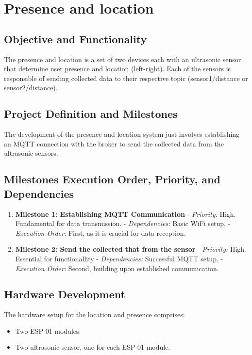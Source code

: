 \documentclass{article}
\begin{document}
\section{Presence and location}

\subsection{Objective and Functionality}
The presence and location is a set of two devices each with an ultrasonic sensor that determine user presence and location (left-right). Each of the sensors is responsible of sending collected data to their respective topic (sensor1/distance or sensor2/distance).

\subsection{Project Definition and Milestones}
The development of the presence and location system just involves establishing an MQTT connection with the broker to send the collected data from the ultrasonic sensors.

\subsection{Milestones Execution Order, Priority, and Dependencies}
\begin{enumerate}
    \item \textbf{Milestone 1: Establishing MQTT Communication}
       - \textit{Priority:} High. Fundamental for data transmission.
       - \textit{Dependencies:} Basic WiFi setup.
       - \textit{Execution Order:} First, as it is crucial for data reception.

    \item \textbf{Milestone 2: Send the collected that from the sensor}
       - \textit{Priority:} High. Essential for functionallity
       - \textit{Dependencies:} Successful MQTT setup.
       - \textit{Execution Order:} Second, building upon established communication.
\end{enumerate}

\subsection{Hardware Development}
The hardware setup for the location and presence comprises:
\begin{itemize}
    \item Two ESP-01 modules.
    \item Two ultrasonic sensor, one for each ESP-01 module.
\end{itemize}
\end{document}
